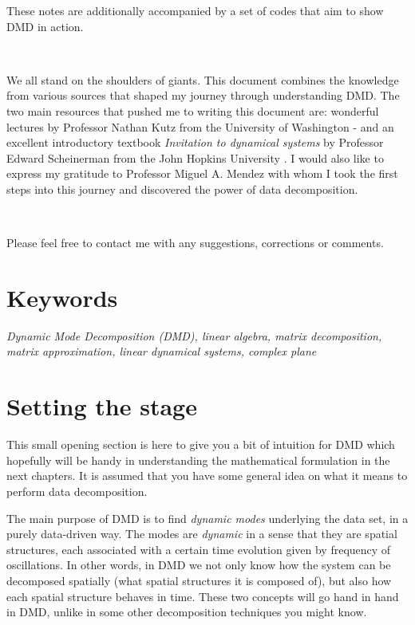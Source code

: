 \documentclass[10pt,twocolumn]{article}
\begin{document}
These notes are additionally accompanied by a set of codes that aim to show DMD in action.

\,\,

We all stand on the shoulders of giants. This document combines the knowledge from various sources that shaped my journey through understanding DMD. The two main resources that pushed me to writing this document are: wonderful lectures by Professor Nathan Kutz from the University of Washington \cite{Prof_Nathan_Kutz_1}-\cite{Prof_Nathan_Kutz_2} and an excellent introductory textbook \textit{Invitation to dynamical systems} by Professor Edward Scheinerman from the John Hopkins University \cite{Prof_Edward_Scheinerman}. I would also like to express my gratitude to Professor Miguel A. Mendez with whom I took the first steps into this journey and discovered the power of data decomposition.

\,\,

Please feel free to contact me with any suggestions, corrections or comments.

\section*{Keywords}

\textit{Dynamic Mode Decomposition (DMD), linear algebra, matrix decomposition, matrix approximation, linear dynamical systems, complex plane}



\tableofcontents


\section{Setting the stage}

This small opening section is here to give you a bit of intuition for DMD which hopefully will be handy in understanding the mathematical formulation in the next chapters. It is assumed that you have some general idea on what it means to perform data decomposition.

The main purpose of DMD is to find \textit{dynamic modes} underlying the data set, in a purely data-driven way. The modes are \textit{dynamic} in a sense that they are spatial structures, each associated with a certain time evolution given by frequency of oscillations. In other words, in DMD we not only know how the system can be decomposed spatially (what spatial structures it is composed of), but also how each spatial structure behaves in time. These two concepts will go hand in hand in DMD, unlike in some other decomposition techniques you might know.
\end{document}
